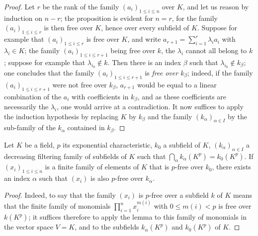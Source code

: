 \begin{proof}
Let $r$ be the rank of the family $(a_i)_{1\leqslant i\leqslant n}$ over $K$, and let us reason by induction on $n-r$; the proposition is evident for $n=r$, for the family $(a_i)_{1\leqslant i\leqslant r}$ is then free over $K$, hence over every subfield of $K$.
Suppose for example that $(a_i)_{1\leqslant i\leqslant r}$ is free over $K$, and write $a_{r+1}=\sum_{i=1}^r\lambda_i a_i$ with $\lambda_i\in K$; the family $(a_i)_{1\leqslant i\leqslant r+1}$ being free over $k$, the $\lambda_i$ cannot all belong to $k$; suppose for example that $\lambda_{i_0}\notin k$.
Then there is an index $\beta$ such that $\lambda_{i_0}\notin k_\beta$; one concludes that the family $(a_i)_{1\leqslant i\leqslant r+1}$ is \emph{free over $k_\beta$}; indeed, if the family $(a_i)_{1\leqslant i\leqslant r+1}$ were not free over $k_\beta$, $a_{r+1}$ would be equal to a linear combination of the $a_i$ with coefficients in $k_\beta$, and as these coefficients are necessarily the $\lambda_i$, one would arrive at a contradiction.
It now suffices to apply the induction hypothesis by replacing $K$ by $k_\beta$ and the family $(k_\alpha)_{\alpha\in I}$ by the sub-family of the $k_\alpha$ contained in $k_\beta$.
\end{proof}

\begin{lemma}[21.8.2]
\label{0.21.8.2}
Let $K$ be a field, $p$ its exponential characteristic, $k_0$ a subfield of $K$, $(k_\alpha)_{\alpha\in I}$ a decreasing filtering family of subfields of $K$ such that $\bigcap_\alpha k_\alpha(K^p)=k_0(K^p)$.
If $(x_i)_{1\leqslant i\leqslant n}$ is a finite family of elements of $K$ that is $p$-free over $k_0$, there exists an index $\alpha$ such that $(x_i)$ is also $p$-free over $k_\alpha$.
\end{lemma}

\begin{proof}
Indeed, to say that the family $(x_i)$ is $p$-free over a subfield $k$ of $K$ means that the finite family of monomials $\prod_{i=1}^n x_i^{m(i)}$ with $0\leqslant m(i)<p$ is free over $k(K^p)$; it suffices therefore to apply the lemma  to this family of monomials in the vector space $V=K$, and to the subfields $k_\alpha(K^p)$ and $k_0(K^p)$ of $K$.
\end{proof}

